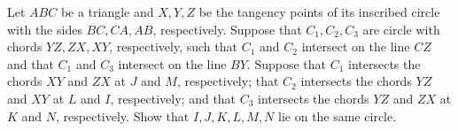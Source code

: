 Let $ABC$ be a triangle and $X,Y,Z$ be the tangency points of its inscribed circle with the sides $BC, CA, AB$,  respectively. Suppose that $C_1, C_2, C_3$ are circle with chords $YZ, ZX, XY$,  respectively, such that $C_1$ and $C_2$ intersect on the line $CZ$ and that $C_1$ and $C_3$ intersect on the line $BY$. Suppose that $C_1$ intersects the chords $XY$ and $ZX$ at $J$ and $M$,  respectively; that $C_2$ intersects the chords $YZ$ and $XY$ at $L$ and $I$,  respectively; and that $C_3$ intersects the chords $YZ$ and $ZX$ at $K$ and $N$,  respectively. Show that $I, J, K, L, M, N$ lie on the same circle.